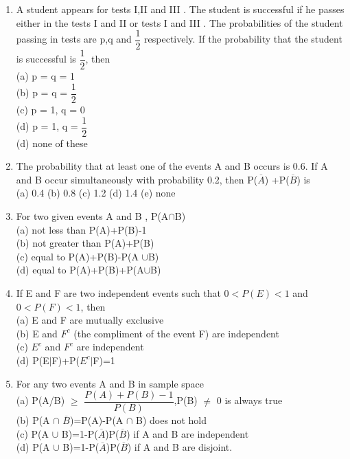 \documentclass[journal,12pt,twocolumn]{IEEEtran}
\begin{document}
\begin{enumerate}[label=\arabic*]
	\item A student appears for tests I,II and III . The student is successful  if he passes either in the tests I and II or tests I and III . The probabilities of the student passing in tests are p,q and $\dfrac{1}{2}$ respectively. If the probability that the student is successful is $\dfrac{1}{2}$, then\\
	(a) p = q = 1\\
	(b) p = q = $\dfrac{1}{2}$\\
	(c) p = 1, q =  0\\
	(d) p = 1, q = $\dfrac{1}{2}$\\
	(d) none of these\\
	\item The probability that at least one of the events A and B occurs is 0.6. If A and B occur simultaneously with probability 0.2, then P($\overline{A}$) +P($\overline{B}$) is\\
	(a) 0.4  (b) 0.8   (c) 1.2   (d) 1.4  (e) none\\
	\item For two given events A and B , P(A$\cap$B)\\
	(a) not less than P(A)+P(B)-1\\
	(b) not greater than P(A)+P(B)\\
	(c) equal to P(A)+P(B)-P(A $\cup$B)\\
	(d) equal to P(A)+P(B)+P(A$\cup$B)\\
	\item If E and F are two independent events such that $0<P(E)<1$ and $0<P(F)<1$, then\\
	(a) E and F are mutually exclusive\\
	(b) E and $F^{c}$ (the compliment of the event F) are independent\\
	(c) $E^{c}$ and $F^{c}$ are independent\\
	(d) P(E$|$F)+P($E^{c}|$F)=1\\
	\item For any two events A and B in sample space\\
	(a) P(A/B)	$\geq$ $\dfrac{P(A)+P(B)-1}{P(B)}$,P(B) $\neq$ 0 is always true\\
	(b) P(A $\cap$ $\overline{B}$)=P(A)-P(A $\cap$ B) does not hold\\
	(c) P(A $\cup$ B)=1-P($\overline{A}$)P($\overline{B}$) if A and B are independent\\
	(d) P(A $\cup$ B)=1-P($\overline{A}$)P($\overline{B}$) if A and B are disjoint.\\

\end{enumerate}
\end{document}
